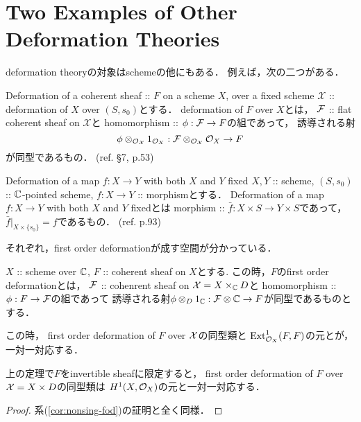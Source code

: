 \documentclass[a4paper]{jsarticle}
\newcommand{\famX}{\mathcal{X}}
\begin{document}
\section{Two Examples of Other Deformation Theories}
    deformation theoryの対象はschemeの他にもある．
    例えば，次の二つがある．

    \begin{itembox}[l]{Deformation of a coherent sheaf :: $F$ on a scheme $X$, over a fixed scheme}
        $\famX$ :: deformation of $X$ over $(S, s_0)$とする．
        deformation of $F$ over $X$とは，
        $\mathcal{F}$ :: flat coherent sheaf on $\famX$と
        homomorphism :: $\phi: \mathcal{F} \to F$の組であって，
        誘導される射
        \[ \phi \otimes_{\shO_{\famX}} 1_{\shO_{X}}: \shF \otimes_{\shO_{\famX}} \shO_{X} \to F \]
        が同型であるもの．
        (ref. \cite{HarDef} \S 7, p.53)
    \end{itembox}

    \begin{itembox}[l]{Deformation of a map $f: X \to Y$ with both $X$ and $Y$ fixed}
        $X, Y$ :: scheme,
        $(S, s_0)$ :: $\mathbb{C}$-pointed scheme,
        $f: X \to Y$ :: morphismとする．
        Deformation of a map $f: X \to Y$ with both $X$ and $Y$ fixedとは
        morphism :: $\bar{f} : X \times S \to Y \times S$であって，
        $\bar{f}|_{X \times \{s_0\}}=f$であるもの．
        (ref. \cite{HaMo}p.93)
    \end{itembox}

    それぞれ，first order deformationが成す空間が分かっている．
    \begin{Thm}
        $X$ :: scheme over $\mathbb{C}$,
        $F$ :: coherent sheaf on $X$とする.
        この時，$F$のfirst order deformationとは，
        $\mathcal{F}$ :: cohenrent sheaf on $\famX=X \times_{\C} D$と
        homomorphism :: $\phi: F \to \mathcal{F}$の組であって
        誘導される射$\phi \otimes_{D} 1_{\mathbb{C}}: \mathcal{F} \otimes \mathbb{C} \to F$が同型であるものとする．

        この時，
        first order deformation of $F$ over $\mathcal{X}$の同型類と
        $\operatorname{Ext}^1_{\mathcal{O}_X}(F, F)$の元とが，一対一対応する．
    \end{Thm}

    \begin{Cor}
        上の定理で$F$をinvertible sheafに限定すると，
        first order deformation of $F$ over $\mathcal{X}=X \times D$の同型類は
        $H^1(X, \mathcal{O}_X)$の元と一対一対応する．
    \end{Cor}
    \begin{proof}
        系(\ref{cor:nonsing-fod})の証明と全く同様．
    \end{proof}
    
\end{document}
